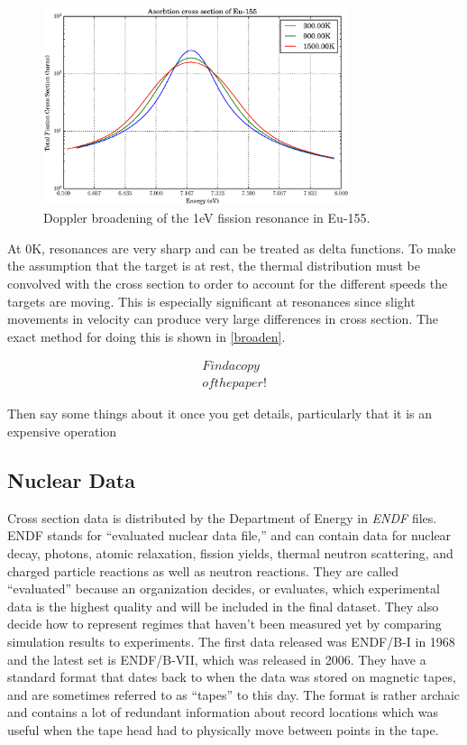 \begin{figure}[h!]
  \label{xs_eu_broaden}
  \centering
    \includegraphics[width=0.8\textwidth]{graphics/xs_eu_broaden.eps}
     \caption{Doppler broadening of the 1eV fission resonance in Eu-155.}
\end{figure}

At 0K, resonances are very sharp and can be treated as delta functions.  To make the assumption that the target is at rest, the thermal distribution must be convolved with the cross section to order to account for the different speeds the targets are moving.  This is especially significant at resonances since slight movements in velocity can produce very large differences in cross section.  The exact method for doing this is shown in \eqref{broaden}\cite{Cullen_Weisbin_1976}.

\begin{equation}
\begin{split}
Find a copy\\
of the paper!
 \end{split}
\label{broaden}
\end{equation}

Then say some things about it once you get details, particularly that it is an expensive operation

\subsection{Nuclear Data}

Cross section data is distributed by the Department of Energy in \emph{ENDF} files.  ENDF stands for ``evaluated nuclear data file,'' and can contain data for nuclear decay, photons, atomic relaxation, fission yields, thermal neutron scattering, and charged particle reactions as well as neutron reactions.  They are called ``evaluated'' because an organization decides, or evaluates, which experimental data is the highest quality and will be included in the final dataset.  They also decide how to represent regimes that haven't been measured yet by comparing simulation results to experiments.   The first data released was ENDF/B-I in 1968 and the latest set is ENDF/B-VII, which was released in 2006.  They have a standard format that dates back to when the data was stored on magnetic tapes, and are sometimes referred to as ``tapes'' to this day.  The format is rather archaic and contains a lot of redundant information about record locations which was useful when the tape head had to physically move between points in the tape.  

